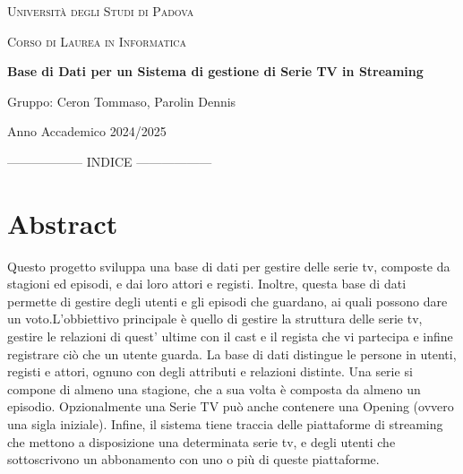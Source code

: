 \documentclass[10pt,a4paper]{article}
\begin{document}
\begin{titlepage}
    \centering
    {\scshape\LARGE Università degli Studi di Padova \par}
    \vspace{1cm}
    {\scshape\Large Corso di Laurea in Informatica \par}
    \vspace{3cm}
    {\Huge\bfseries Base di Dati per un Sistema di gestione di Serie TV in Streaming \par}
    \vspace{2cm}
    {\Large Gruppo: Ceron Tommaso, Parolin Dennis\par}
    \vfill
    {\large Anno Accademico 2024/2025\par}
\end{titlepage}

------------------ INDICE  ------------------
\tableofcontents
\newpage


\section{Abstract}
Questo progetto sviluppa una base di dati per gestire delle serie tv, composte da stagioni ed episodi, e dai loro attori e registi. Inoltre, questa base di dati permette di gestire degli utenti e gli episodi che guardano, ai quali possono dare un voto.\newline L'obbiettivo principale è quello di gestire la struttura delle serie tv, gestire le relazioni di quest’ ultime con il cast e il regista che vi partecipa e infine registrare ciò che un utente guarda.\newline
La base di dati distingue le persone in utenti, registi e attori, ognuno con degli attributi e relazioni distinte.\newline
Una serie si compone di almeno una stagione, che a sua volta è composta da almeno un episodio. Opzionalmente una Serie TV può anche contenere una Opening (ovvero una sigla iniziale).\newline
Infine, il sistema tiene traccia delle piattaforme di streaming che mettono a disposizione una determinata serie tv, e degli utenti che sottoscrivono un abbonamento con uno o più di queste piattaforme. \newline
\end{document}

